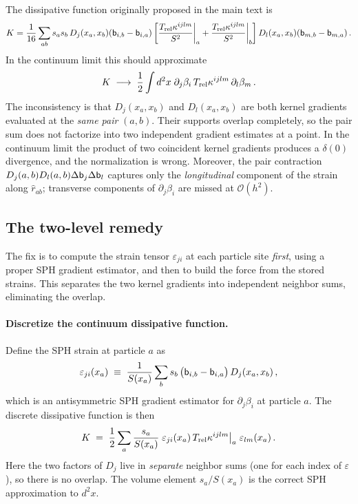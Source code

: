 \documentclass[12pt,aps,preprint,nofootinbib,noshowkeys,noshowpacs,longbibliography,superscriptaddress,tightenlines]{revtex4-2}
\def\bbeta{{\sf b}}
\begin{document}
The dissipative function originally proposed in the main text is
\begin{equation}
    K = \frac{1}{16}\sum_{ab} s_a s_b\,
    D_j(x_a,x_b)(\bbeta_{i,b}-\bbeta_{i,a})
    \left[\frac{T_{\rm rel}\kappa^{ijlm}}{S^2}\bigg|_a
         +\frac{T_{\rm rel}\kappa^{ijlm}}{S^2}\bigg|_b\right]
    D_l(x_a,x_b)(\bbeta_{m,b}-\bbeta_{m,a})\,.
\end{equation}
In the continuum limit this should approximate
\begin{equation}
    K \;\longrightarrow\; \frac{1}{2}\int d^2x\; \partial_j\beta_i\,
    T_{\rm rel}\kappa^{ijlm}\,\partial_l\beta_m \,.
\end{equation}
The inconsistency is that $D_j(x_a,x_b)$ and $D_l(x_a,x_b)$ are both kernel
gradients evaluated at the \emph{same pair} $(a,b)$.  Their supports overlap
completely, so the pair sum does not factorize into two independent gradient
estimates at a point.  In the continuum limit the product of two coincident
kernel gradients produces a $\delta(0)$ divergence, and the normalization is
wrong.  Moreover, the pair contraction $D_j(a,b)D_l(a,b)\Delta\bbeta_j\Delta\bbeta_l$
captures only the \emph{longitudinal} component of the strain along $\hat r_{ab}$;
transverse components of $\partial_j\beta_i$ are missed at $\mathcal{O}(h^2)$.

\subsection*{The two-level remedy}

The fix is to compute the strain tensor $\varepsilon_{ji}$ at each particle site
\emph{first}, using a proper SPH gradient estimator, and then to build the force
from the stored strains.  This separates the two kernel gradients into independent
neighbor sums, eliminating the overlap.

\paragraph{Discretize the continuum dissipative function.}
Define the SPH strain at particle $a$ as
\begin{equation}
\label{eq:strain-impl}
    \varepsilon_{ji}(x_a) \;\equiv\;
    \frac{1}{S(x_a)}\sum_b s_b\,
    \bigl(\bbeta_{i,b} - \bbeta_{i,a}\bigr)\,D_j(x_a,x_b) \,,
\end{equation}
which is an antisymmetric SPH gradient estimator for $\partial_j\beta_i$ at
particle $a$.  The discrete dissipative function is then
\begin{equation}
\label{eq:K_twolevel-impl}
    K \;=\; \frac{1}{2} \sum_a \frac{s_a}{S(x_a)}\;
    \varepsilon_{ji}(x_a)\,
    T_{\rm rel}\kappa^{ijlm}\big|_a\;
    \varepsilon_{lm}(x_a) \,.
\end{equation}
Here the two factors of $D_j$ live in \emph{separate} neighbor sums (one for
each index of $\varepsilon$), so there is no overlap.  The volume element
$s_a/S(x_a)$ is the correct SPH approximation to $d^2x$.
\end{document}
